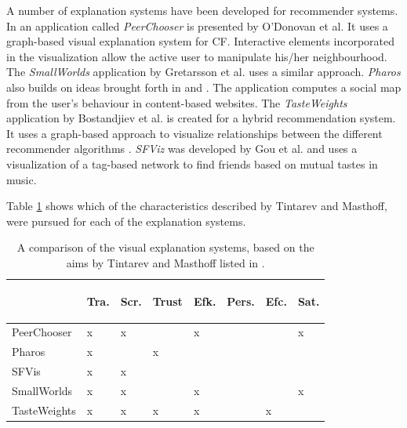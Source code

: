 \documentclass[a4paper,10pt,twocolumn]{article}
\begin{document}
A number of explanation systems have been developed for recommender systems. In \cite{odonovan:2008} an application called \emph{PeerChooser} is presented by O'Donovan et al. It uses a graph-based visual explanation system for CF. Interactive elements incorporated in the visualization allow the active user to manipulate his/her neighbourhood. The \emph{SmallWorlds} application by Gretarsson et al. \cite{gretarsson:2010} uses a similar approach. \emph{Pharos} \cite{zhao:2010} also builds on ideas brought forth in \cite{herlocker:2000} and \cite{odonovan:2008}. The application computes a social map from the user's behaviour in content-based websites. The \emph{TasteWeights} application by Bostandjiev et al. \cite{bostandjiev:2012} is created for a hybrid recommendation system. It uses a graph-based approach to visualize relationships between the different recommender algorithms \cite{bostandjiev:2012}. \emph{SFViz} was developed by Gou et al. \cite{gou:2011:SIF:2016656.2016671} and uses a visualization of a tag-based network to find friends based on mutual tastes in music.

Table \ref{table:comparison:aims} shows which of the characteristics described by Tintarev and Masthoff, were pursued for each of the explanation systems.

\begin{table}
	\caption{A comparison of the visual explanation systems, based on the aims by Tintarev and Masthoff listed in \cite{tintarev:2007:SER:1547550.1547664}.}
	\begin{tabular}{l | l l l l l l l }
		\hline
									&	\begin{sideways}Tra.\end{sideways}
									& \begin{sideways}Scr.\end{sideways}
									& \begin{sideways}Trust\end{sideways}
									& \begin{sideways}Efk.\end{sideways}
									& \begin{sideways}Pers.\end{sideways}
									& \begin{sideways}Efc.\end{sideways}
									& \begin{sideways}Sat.\end{sideways}  \\
		\hline
		PeerChooser		&	x &	x	&		&	x	& 	& 	& x	\\
		Pharos				&	x	&		&	x	&		& 	& 	&  	\\
		SFVis					&	x &	x	&		&		& 	& 	&  	\\
		SmallWorlds		&	x	&	x	&		&	x	& 	& 	& x	\\
		TasteWeights	&	x &	x	&	x	&	x	& 	& x	&  	\\
		\hline
	\end{tabular}
	\label{table:comparison:aims}
\end{table}
\end{document}
